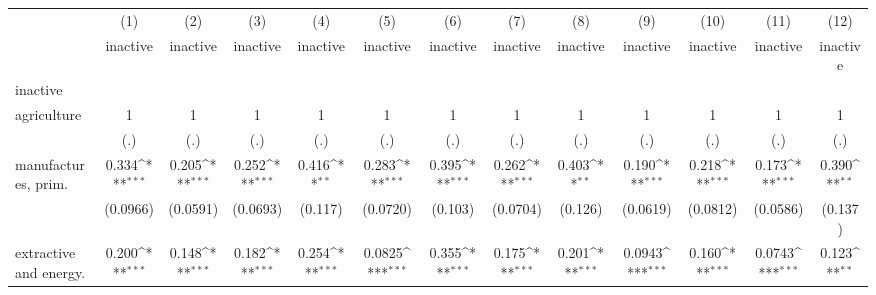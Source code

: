 {
\def\sym#1{\ifmmode^{#1}\else\(^{#1}\)\fi}
\begin{tabular}{l*{12}{c}}
\hline\hline
                    &\multicolumn{1}{c}{(1)}&\multicolumn{1}{c}{(2)}&\multicolumn{1}{c}{(3)}&\multicolumn{1}{c}{(4)}&\multicolumn{1}{c}{(5)}&\multicolumn{1}{c}{(6)}&\multicolumn{1}{c}{(7)}&\multicolumn{1}{c}{(8)}&\multicolumn{1}{c}{(9)}&\multicolumn{1}{c}{(10)}&\multicolumn{1}{c}{(11)}&\multicolumn{1}{c}{(12)}\\
                    &\multicolumn{1}{c}{inactive}&\multicolumn{1}{c}{inactive}&\multicolumn{1}{c}{inactive}&\multicolumn{1}{c}{inactive}&\multicolumn{1}{c}{inactive}&\multicolumn{1}{c}{inactive}&\multicolumn{1}{c}{inactive}&\multicolumn{1}{c}{inactive}&\multicolumn{1}{c}{inactive}&\multicolumn{1}{c}{inactive}&\multicolumn{1}{c}{inactive}&\multicolumn{1}{c}{inactive}\\
\hline
inactive            &                     &                     &                     &                     &                     &                     &                     &                     &                     &                     &                     &                     \\
agriculture         &           1         &           1         &           1         &           1         &           1         &           1         &           1         &           1         &           1         &           1         &           1         &           1         \\
                    &         (.)         &         (.)         &         (.)         &         (.)         &         (.)         &         (.)         &         (.)         &         (.)         &         (.)         &         (.)         &         (.)         &         (.)         \\
[1em]
manufactures, prim. &       0.334\sym{***}&       0.205\sym{***}&       0.252\sym{***}&       0.416\sym{**} &       0.283\sym{***}&       0.395\sym{***}&       0.262\sym{***}&       0.403\sym{**} &       0.190\sym{***}&       0.218\sym{***}&       0.173\sym{***}&       0.390\sym{**} \\
                    &    (0.0966)         &    (0.0591)         &    (0.0693)         &     (0.117)         &    (0.0720)         &     (0.103)         &    (0.0704)         &     (0.126)         &    (0.0619)         &    (0.0812)         &    (0.0586)         &     (0.137)         \\
[1em]
extractive and energy.&       0.200\sym{***}&       0.148\sym{***}&       0.182\sym{***}&       0.254\sym{***}&      0.0825\sym{***}&       0.355\sym{***}&       0.175\sym{***}&       0.201\sym{***}&      0.0943\sym{***}&       0.160\sym{***}&      0.0743\sym{***}&       0.123\sym{**} \\

\end{tabular}}
